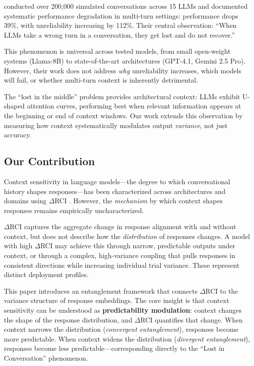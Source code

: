\documentclass[11pt]{article}
\begin{document}
\citet{laban2025lost} conducted over 200,000 simulated conversations across 15 LLMs and documented systematic performance degradation in multi-turn settings: performance drops 39\%, with unreliability increasing by 112\%. Their central observation: ``When LLMs take a wrong turn in a conversation, they get lost and do not recover.''

This phenomenon is universal across tested models, from small open-weight systems (Llama-8B) to state-of-the-art architectures (GPT-4.1, Gemini 2.5 Pro). However, their work does not address \emph{why} unreliability increases, which models will fail, or whether multi-turn context is inherently detrimental.

The ``lost in the middle'' problem \citep{liu2024lost} provides architectural context: LLMs exhibit U-shaped attention curves, performing best when relevant information appears at the beginning or end of context windows. Our work extends this observation by measuring how context systematically modulates output \emph{variance}, not just accuracy.

\subsection{Our Contribution}

Context sensitivity in language models---the degree to which conversational history shapes responses---has been characterized across architectures and domains using $\Delta$RCI \citep{laxman2026paper1, laxman2026paper2}. However, the \emph{mechanism} by which context shapes responses remains empirically uncharacterized.

$\Delta$RCI captures the aggregate change in response alignment with and without context, but does not describe how the \emph{distribution} of responses changes. A model with high $\Delta$RCI may achieve this through narrow, predictable outputs under context, or through a complex, high-variance coupling that pulls responses in consistent directions while increasing individual trial variance. These represent distinct deployment profiles.

This paper introduces an entanglement framework that connects $\Delta$RCI to the variance structure of response embeddings. The core insight is that context sensitivity can be understood as \textbf{predictability modulation}: context changes the shape of the response distribution, and $\Delta$RCI quantifies that change. When context narrows the distribution (\emph{convergent entanglement}), responses become more predictable. When context widens the distribution (\emph{divergent entanglement}), responses become less predictable---corresponding directly to the ``Lost in Conversation'' phenomenon.
\end{document}
